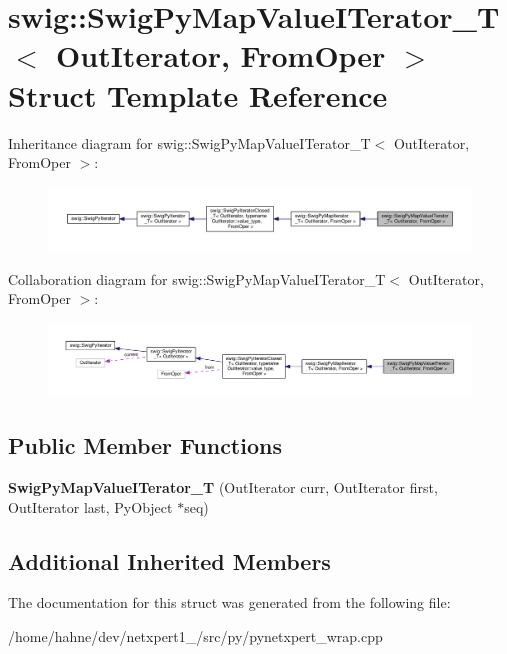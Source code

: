 \hypertarget{structswig_1_1SwigPyMapValueITerator__T}{}\section{swig\+:\+:Swig\+Py\+Map\+Value\+I\+Terator\+\_\+T$<$ Out\+Iterator, From\+Oper $>$ Struct Template Reference}
\label{structswig_1_1SwigPyMapValueITerator__T}


Inheritance diagram for swig\+:\+:Swig\+Py\+Map\+Value\+I\+Terator\+\_\+T$<$ Out\+Iterator, From\+Oper $>$\+:\nopagebreak
\begin{figure}[H]
\begin{center}
\leavevmode
\includegraphics[width=350pt]{structswig_1_1SwigPyMapValueITerator__T__inherit__graph}
\end{center}
\end{figure}


Collaboration diagram for swig\+:\+:Swig\+Py\+Map\+Value\+I\+Terator\+\_\+T$<$ Out\+Iterator, From\+Oper $>$\+:\nopagebreak
\begin{figure}[H]
\begin{center}
\leavevmode
\includegraphics[width=350pt]{structswig_1_1SwigPyMapValueITerator__T__coll__graph}
\end{center}
\end{figure}
\subsection*{Public Member Functions}
\begin{DoxyCompactItemize}
\item 
{\bfseries Swig\+Py\+Map\+Value\+I\+Terator\+\_\+T} (Out\+Iterator curr, Out\+Iterator first, Out\+Iterator last, Py\+Object $\ast$seq)\hypertarget{structswig_1_1SwigPyMapValueITerator__T_ac052c444538753f8a9e977240f6bb93e}{}\label{structswig_1_1SwigPyMapValueITerator__T_ac052c444538753f8a9e977240f6bb93e}

\end{DoxyCompactItemize}
\subsection*{Additional Inherited Members}


The documentation for this struct was generated from the following file\+:\begin{DoxyCompactItemize}
\item 
/home/hahne/dev/netxpert1\+\_/src/py/pynetxpert\+\_\+wrap.\+cpp\end{DoxyCompactItemize}
